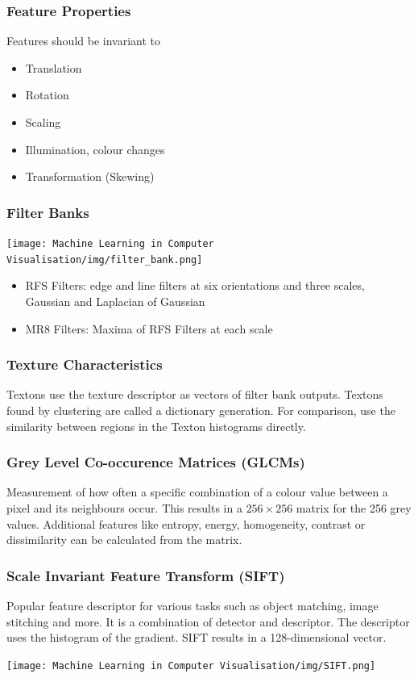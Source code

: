 \documentclass[x11names,11pt,a4paper]{article}
\theoremstyle{definition}
\begin{document}
\subsubsection{Feature Properties}
Features should be invariant to
\begin{itemize}[label=-]
	\item Translation
	\item Rotation
	\item Scaling
	\item Illumination, colour changes
	\item Transformation (Skewing)
\end{itemize}

\subsubsection{Filter Banks}
\begin{center}
	\texttt{[image: Machine Learning in Computer Visualisation/img/filter\_bank.png]}
\end{center}
\begin{itemize}
	\item RFS Filters: edge and line filters at six orientations and three scales, Gaussian and Laplacian of Gaussian
	\item MR8 Filters: Maxima of RFS Filters at each scale
\end{itemize}

\subsubsection{Texture Characteristics}
Textons use the texture descriptor as vectors of filter bank outputs. Textons found by clustering are called a dictionary generation. For comparison, use the similarity between regions in the Texton histograms directly.

\subsubsection{Grey Level Co-occurence Matrices (GLCMs)}
Measurement of how often a specific combination of a colour value between a pixel and its neighbours occur. This results in a $256\times 256$ matrix for the 256 grey values. Additional features like entropy, energy, homogeneity, contrast or dissimilarity can be calculated from the matrix.

\subsubsection{Scale Invariant Feature Transform (SIFT)}
Popular feature descriptor for various tasks such as object matching, image stitching and more. It is a combination of detector and descriptor. The descriptor uses the histogram of the gradient. SIFT results in a 128-dimensional vector.
\begin{center}
	\texttt{[image: Machine Learning in Computer Visualisation/img/SIFT.png]}
\end{center}
\end{document}

